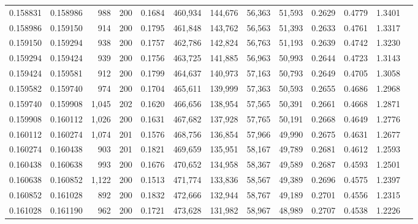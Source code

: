 \begin{tabular}{rrrrrrrrrrrrr}
0.158831 & 0.158986 &   988 & 200 &                                     0.1684 & 460,934 & 144,676 &  56,363 &  51,593 & 0.2629 & 0.4779 & 1.3401 \\
0.158986 & 0.159150 &   914 & 200 &                                     0.1795 & 461,848 & 143,762 &  56,563 &  51,393 & 0.2633 & 0.4761 & 1.3317 \\
0.159150 & 0.159294 &   938 & 200 &                                     0.1757 & 462,786 & 142,824 &  56,763 &  51,193 & 0.2639 & 0.4742 & 1.3230 \\
0.159294 & 0.159424 &   939 & 200 &                                     0.1756 & 463,725 & 141,885 &  56,963 &  50,993 & 0.2644 & 0.4723 & 1.3143 \\
0.159424 & 0.159581 &   912 & 200 &                                     0.1799 & 464,637 & 140,973 &  57,163 &  50,793 & 0.2649 & 0.4705 & 1.3058 \\
0.159582 & 0.159740 &   974 & 200 &                                     0.1704 & 465,611 & 139,999 &  57,363 &  50,593 & 0.2655 & 0.4686 & 1.2968 \\
0.159740 & 0.159908 & 1,045 & 202 &                                     0.1620 & 466,656 & 138,954 &  57,565 &  50,391 & 0.2661 & 0.4668 & 1.2871 \\
0.159908 & 0.160112 & 1,026 & 200 &                                     0.1631 & 467,682 & 137,928 &  57,765 &  50,191 & 0.2668 & 0.4649 & 1.2776 \\
0.160112 & 0.160274 & 1,074 & 201 &                                     0.1576 & 468,756 & 136,854 &  57,966 &  49,990 & 0.2675 & 0.4631 & 1.2677 \\
0.160274 & 0.160438 &   903 & 201 &                                     0.1821 & 469,659 & 135,951 &  58,167 &  49,789 & 0.2681 & 0.4612 & 1.2593 \\
0.160438 & 0.160638 &   993 & 200 &                                     0.1676 & 470,652 & 134,958 &  58,367 &  49,589 & 0.2687 & 0.4593 & 1.2501 \\
0.160638 & 0.160852 & 1,122 & 200 &                                     0.1513 & 471,774 & 133,836 &  58,567 &  49,389 & 0.2696 & 0.4575 & 1.2397 \\
0.160852 & 0.161028 &   892 & 200 &                                     0.1832 & 472,666 & 132,944 &  58,767 &  49,189 & 0.2701 & 0.4556 & 1.2315 \\
0.161028 & 0.161190 &   962 & 200 &                                     0.1721 & 473,628 & 131,982 &  58,967 &  48,989 & 0.2707 & 0.4538 & 1.2226 \\

\end{tabular}
